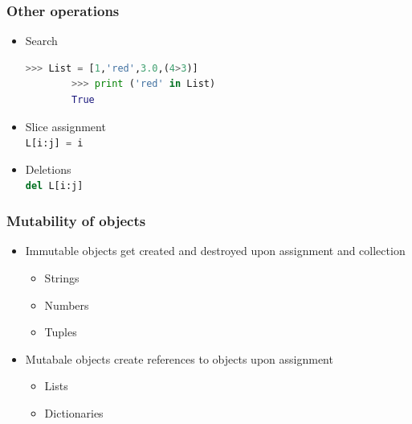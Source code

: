 \documentclass[xcolor=table,10pt,final]{beamer}
\begin{document}
\begin{frame}[fragile]
  \frametitle{Other operations}
  \begin{itemize}
    \item Search\\
      \begin{lstlisting}[language=python]
        >>> List = [1,'red',3.0,(4>3)]
        >>> print ('red' in List)
        True
      \end{lstlisting}
    \item Slice assignment\\
      \lstinline[language=python]|L[i:j] = i|
    \item Deletions\\
      \lstinline[language=python]|del L[i:j]|
  \end{itemize}

\end{frame}

\begin{frame}[fragile]
  \frametitle{Mutability of objects}
  \begin{itemize}
    \item Immutable objects get created and destroyed upon assignment and collection
      \begin{itemize}
        \item Strings
        \item Numbers
        \item Tuples
      \end{itemize}
    \item Mutabale objects create references to objects upon assignment
      \begin{itemize}
        \item Lists
        \item Dictionaries
      \end{itemize}
  \end{itemize}
\end{frame}
\end{document}
